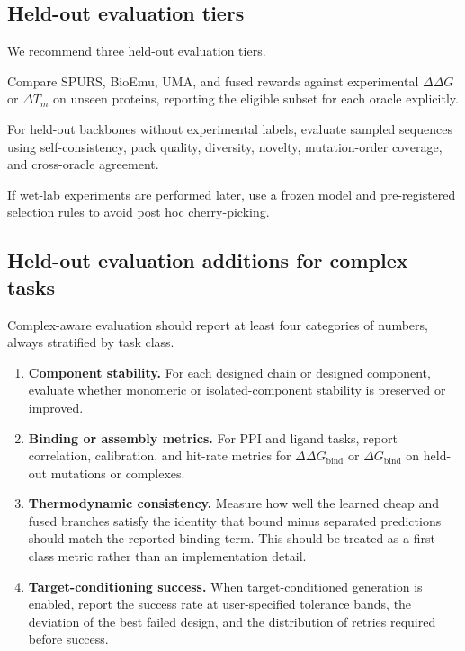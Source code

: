 \documentclass[11pt]{article}
\newcommand{\ddG}{\ensuremath{\Delta\Delta G \ }}
\newcommand{\DGbind}{\ensuremath{\Delta G_{\mathrm{bind}}}}
\newcommand{\DDGbind}{\ensuremath{\Delta\Delta G_{\mathrm{bind}}}}
\begin{document}
\subsection{Held-out evaluation tiers}

We recommend three held-out evaluation tiers.
\begin{description}[leftmargin=1.5em,style=nextline]
    \item[Tier 1: oracle validation.] Compare SPURS, BioEmu, UMA, and fused rewards against experimental \ddG or $\Delta T_m$ on unseen proteins, reporting the eligible subset for each oracle explicitly.
    \item[Tier 2: design validation.] For held-out backbones without experimental labels, evaluate sampled sequences using self-consistency, pack quality, diversity, novelty, mutation-order coverage, and cross-oracle agreement.
    \item[Tier 3: experimental shortlist.] If wet-lab experiments are performed later, use a frozen model and pre-registered selection rules to avoid post hoc cherry-picking.
\end{description}



\subsection{Held-out evaluation additions for complex tasks}

Complex-aware evaluation should report at least four categories of numbers, always stratified by task class.
\begin{enumerate}[leftmargin=1.5em]
    \item \textbf{Component stability.} For each designed chain or designed component, evaluate whether monomeric or isolated-component stability is preserved or improved.
    \item \textbf{Binding or assembly metrics.} For PPI and ligand tasks, report correlation, calibration, and hit-rate metrics for \DDGbind{} or \DGbind{} on held-out mutations or complexes.
    \item \textbf{Thermodynamic consistency.} Measure how well the learned cheap and fused branches satisfy the identity that bound minus separated predictions should match the reported binding term. This should be treated as a first-class metric rather than an implementation detail.
    \item \textbf{Target-conditioning success.} When target-conditioned generation is enabled, report the success rate at user-specified tolerance bands, the deviation of the best failed design, and the distribution of retries required before success.
\end{enumerate}
\end{document}
